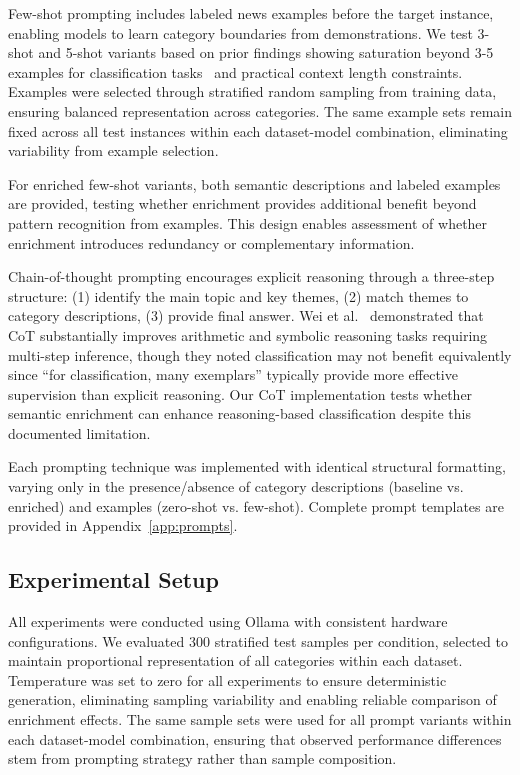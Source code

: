 \documentclass[sigconf,nonacm]{acmart}
\begin{document}
Few-shot prompting includes labeled news examples before the target instance, enabling models to learn category boundaries from demonstrations. We test 3-shot and 5-shot variants based on prior findings showing saturation beyond 3-5 examples for classification tasks~\cite{brown2020language} and practical context length constraints. Examples were selected through stratified random sampling from training data, ensuring balanced representation across categories. The same example sets remain fixed across all test instances within each dataset-model combination, eliminating variability from example selection.

For enriched few-shot variants, both semantic descriptions and labeled examples are provided, testing whether enrichment provides additional benefit beyond pattern recognition from examples. This design enables assessment of whether enrichment introduces redundancy or complementary information.

Chain-of-thought prompting encourages explicit reasoning through a three-step structure: (1) identify the main topic and key themes, (2) match themes to category descriptions, (3) provide final answer. Wei et al.~\cite{wei2022chain} demonstrated that CoT substantially improves arithmetic and symbolic reasoning tasks requiring multi-step inference, though they noted classification may not benefit equivalently since ``for classification, many exemplars'' typically provide more effective supervision than explicit reasoning. Our CoT implementation tests whether semantic enrichment can enhance reasoning-based classification despite this documented limitation.

Each prompting technique was implemented with identical structural formatting, varying only in the presence/absence of category descriptions (baseline vs. enriched) and examples (zero-shot vs. few-shot). Complete prompt templates are provided in Appendix~\ref{app:prompts}.

\subsection{Experimental Setup}

All experiments were conducted using Ollama with consistent hardware configurations. We evaluated 300 stratified test samples per condition, selected to maintain proportional representation of all categories within each dataset. Temperature was set to zero for all experiments to ensure deterministic generation, eliminating sampling variability and enabling reliable comparison of enrichment effects. The same sample sets were used for all prompt variants within each dataset-model combination, ensuring that observed performance differences stem from prompting strategy rather than sample composition.
\end{document}
